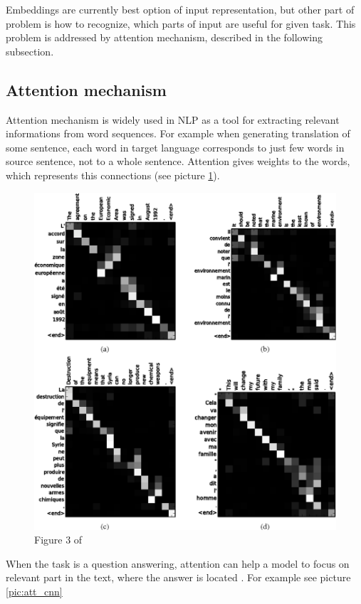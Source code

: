 Embeddings are currently best option of input representation, but other part of problem is how to recognize, which parts of input are useful for given task. This problem is addressed by attention mechanism, described in the following subsection. 

\subsection{Attention mechanism}
\label{sub:attention}
Attention mechanism \citep{Bahdanau} is widely used in NLP as a tool for extracting relevant informations from word sequences. For example when generating translation of some sentence, each word in target language corresponds to just few words in source sentence, not to a whole sentence. Attention gives weights to the words, which represents this connections (see picture \ref{pic:att_trans}).

\begin{figure}[h]
\label{pic:att_trans}
\centering
\includegraphics[width=0.7\columnwidth]{../img/attention_translate}
\caption{Figure 3 of \citep{Bahdanau}
}
\end{figure}


When the task is a question answering, attention can help a model to focus on relevant part in the text, where the answer is located \citep{Santos2016}. For example see picture \ref{pic:att_cnn}

